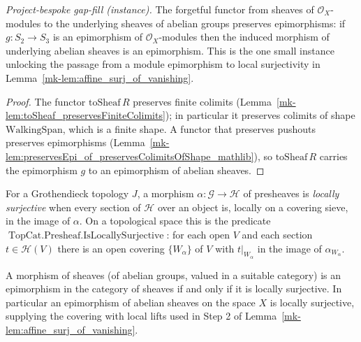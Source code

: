 \begin{lemma}
  \label{mk-lem:to_sheaf_preserves_epi}
  \leanok
  \textit{Project-bespoke gap-fill (instance).}
  The forgetful functor from sheaves of \(\mathcal{O}_X\)-modules to the underlying sheaves of
  abelian groups preserves epimorphisms: if \(g : S_2 \to S_3\) is an epimorphism of
  \(\mathcal{O}_X\)-modules then the induced morphism of underlying abelian sheaves is an
  epimorphism. This is the one small instance unlocking the passage from a module epimorphism to
  local surjectivity in Lemma~\ref{mk-lem:affine_surj_of_vanishing}.
\end{lemma}
\begin{proof}
  \leanok
  The functor \(\mathrm{toSheaf}\,R\) preserves finite colimits
  (Lemma~\ref{mk-lem:toSheaf_preservesFiniteColimits}); in particular it preserves colimits of shape
  \(\mathrm{WalkingSpan}\), which is a finite shape. A functor that preserves pushouts preserves
  epimorphisms (Lemma~\ref{mk-lem:preservesEpi_of_preservesColimitsOfShape_mathlib}), so
  \(\mathrm{toSheaf}\,R\) carries the epimorphism \(g\) to an epimorphism of abelian sheaves.
\end{proof}

\begin{lemma}
  \label{mk-lem:presheaf_is_locally_surjective}
  \mathlibok

  For a Grothendieck topology \(J\), a morphism \(\alpha : \mathcal{G} \to \mathcal{H}\) of presheaves
  is \emph{locally surjective} when every section of \(\mathcal{H}\) over an object is, locally on a
  covering sieve, in the image of \(\alpha\). On a topological space this is the predicate
  \(\operatorname{TopCat.Presheaf.IsLocallySurjective}\): for each open \(V\) and each section
  \(t \in \mathcal{H}(V)\) there is an open covering \(\{W_\alpha\}\) of \(V\) with \(t|_{W_\alpha}\)
  in the image of \(\alpha_{W_\alpha}\).
\end{lemma}

\begin{lemma}
  \label{mk-lem:sheaf_locally_surjective_iff_epi}
  \mathlibok

  A morphism of sheaves (of abelian groups, valued in a suitable category) is an epimorphism in the
  category of sheaves if and only if it is locally surjective. In particular an epimorphism of
  abelian sheaves on the space \(X\) is locally surjective, supplying the covering with local lifts
  used in Step 2 of Lemma~\ref{mk-lem:affine_surj_of_vanishing}.
\end{lemma}

